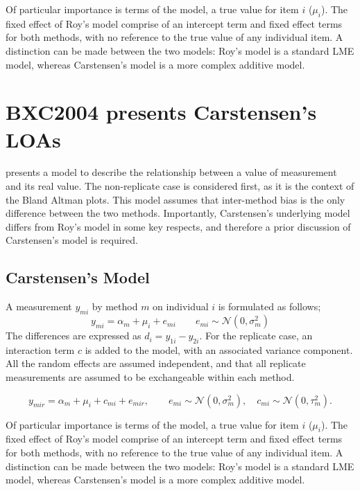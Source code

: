\documentclass[12pt, a4paper]{report}
\theoremstyle{plain}
\theoremstyle{definition}
\theoremstyle{remark}
\begin{document}
Of particular importance is terms of the model, a true value for item $i$ ($\mu_{i}$).  The fixed effect of Roy's model comprise of an intercept term and fixed effect terms for both methods, with no reference to the true value of any individual item. A distinction can be made between the two models: Roy's model is a standard LME model, whereas Carstensen's model is a more complex additive model.



\section{BXC2004 presents Carstensen's LOAs}
\citet{BXC2004} presents a model to describe the relationship between a value of measurement and its real value. The non-replicate case is considered first, as it is the context of the Bland Altman plots. This model assumes that inter-method bias is the only difference between the two methods. Importantly, Carstensen's underlying model differs from Roy's model in some key respects, and therefore a prior discussion of Carstensen's model is required.

\subsection{Carstensen's Model}

A measurement $y_{mi}$ by method $m$ on individual $i$ is formulated as follows;
\begin{equation}
y_{mi}  = \alpha_{m} + \mu_{i} + e_{mi} \qquad  e_{mi} \sim
\mathcal{N}(0,\sigma^{2}_{m})
\end{equation}
The differences are expressed as $d_{i} = y_{1i} - y_{2i}$. For the replicate case, an interaction term $c$ is added to the model, with an associated variance component. All the random effects are assumed independent, and that all replicate measurements are assumed to be exchangeable within each method.

\begin{equation}
y_{mir}  = \alpha_{m} + \mu_{i} + c_{mi} + e_{mir}, \qquad  e_{mi}
\sim \mathcal{N}(0,\sigma^{2}_{m}), \quad c_{mi} \sim \mathcal{N}(0,\tau^{2}_{m}).
\end{equation}

Of particular importance is terms of the model, a true value for item $i$ ($\mu_{i}$).  The fixed effect of Roy's model comprise of an intercept term and fixed effect terms for both methods, with no reference to the true value of any individual item. A distinction can be made between the two models: Roy's model is a standard LME model, whereas Carstensen's model is a more complex additive model.
\end{document}
